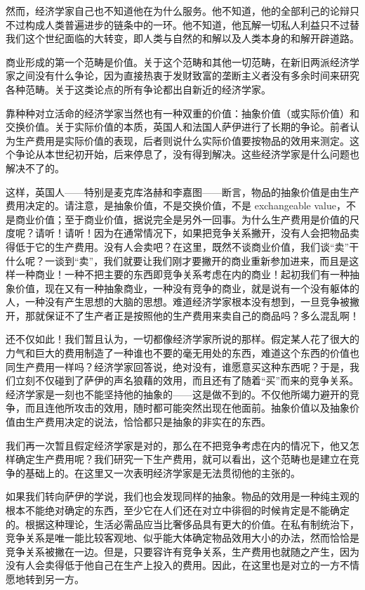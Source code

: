 \documentclass[a4paper,twoside,12pt,AutoFakeBold]{ctexart}
\begin{document}
然而，经济学家自己也不知道他在为什么服务。他不知道，他的全部利己的论辩只不过构成人类普遍进步的链条中的一环。他不知道，他瓦解一切私人利益只不过替我们这个世纪面临的大转变，即人类与自然的和解以及人类本身的和解开辟道路。

商业形成的第一个范畴是价值。关于这个范畴和其他一切范畴，在新旧两派经济学家之间没有什么争论，因为直接热衷于发财致富的垄断主义者没有多余时间来研究各种范畴。关于这类论点的所有争论都出自新近的经济学家。

靠种种对立活命的经济学家当然也有一种双重的价值：抽象价值（或实际价值）和交换价值。关于实际价值的本质，英国人和法国人萨伊进行了长期的争论。前者认为生产费用是实际价值的表现，后者则说什么实际价值要按物品的效用来测定。这个争论从本世纪初开始，后来停息了，没有得到解决。这些经济学家是什么问题也解决不了的。

这样，英国人——特别是麦克库洛赫和李嘉图——断言，物品的抽象价值是由生产费用决定的。请注意，是抽象价值，不是交换价值，不是 exchangeable value，不是商业价值；至于商业价值，据说完全是另外一回事。为什么生产费用是价值的尺度呢？请听！请听！因为在通常情况下，如果把竞争关系撇开，没有人会把物品卖得低于它的生产费用。没有人会卖吧？在这里，既然不谈商业价值，我们谈“卖”干什么呢？一谈到“卖”，我们就要让我们刚才要撇开的商业重新参加进来，而且是这样一种商业！一种不把主要的东西即竞争关系考虑在内的商业！起初我们有一种抽象价值，现在又有一种抽象商业，一种没有竞争的商业，就是说有一个没有躯体的人，一种没有产生思想的大脑的思想。难道经济学家根本没有想到，一旦竞争被撇开，那就保证不了生产者正是按照他的生产费用来卖自己的商品吗？多么混乱啊！

还不仅如此！我们暂且认为，一切都像经济学家所说的那样。假定某人花了很大的力气和巨大的费用制造了一种谁也不要的毫无用处的东西，难道这个东西的价值也同生产费用一样吗？经济学家回答说，绝对没有，谁愿意买这种东西呢？于是，我们立刻不仅碰到了萨伊的声名狼藉的效用，而且还有了随着“买”而来的竞争关系。经济学家是一刻也不能坚持他的抽象的——这是做不到的。不仅他所竭力避开的竞争，而且连他所攻击的效用，随时都可能突然出现在他面前。抽象价值以及抽象价值由生产费用决定的说法，恰恰都只是抽象的非实在的东西。

我们再一次暂且假定经济学家是对的，那么在不把竞争考虑在内的情况下，他又怎样确定生产费用呢？我们研究一下生产费用，就可以看出，这个范畴也是建立在竞争的基础上的。在这里又一次表明经济学家是无法贯彻他的主张的。

如果我们转向萨伊的学说，我们也会发现同样的抽象。物品的效用是一种纯主观的根本不能绝对确定的东西，至少它在人们还在对立中徘徊的时候肯定是不能确定的。根据这种理论，生活必需品应当比奢侈品具有更大的价值。在私有制统治下，竞争关系是唯一能比较客观地、似乎能大体确定物品效用大小的办法，然而恰恰是竞争关系被撇在一边。但是，只要容许有竞争关系，生产费用也就随之产生，因为没有人会卖得低于他自己在生产上投入的费用。因此，在这里也是对立的一方不情愿地转到另一方。
\end{document}
